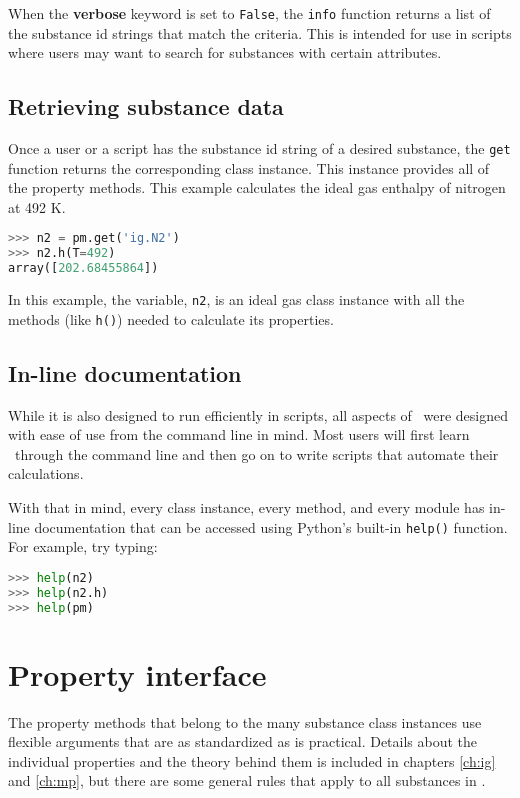 When the {\bf verbose} keyword is set to \texttt{False}, the \texttt{info} function returns a list of the substance id strings that match the criteria.  This is intended for use in scripts where users may want to search for substances with certain attributes.

\subsection{Retrieving substance data}

Once a user or a script has the substance id string of a desired substance, the \texttt{get} function returns the corresponding class instance.  This instance provides all of the property methods.  This example calculates the ideal gas enthalpy of nitrogen at 492 K.
\begin{lstlisting}[language=Python]
>>> n2 = pm.get('ig.N2')
>>> n2.h(T=492)
array([202.68455864])
\end{lstlisting}

In this example, the variable, \texttt{n2}, is an ideal gas class instance with all the methods (like \texttt{h()}) needed to calculate its properties.

\subsection{In-line documentation}

While it is also designed to run efficiently in scripts, all aspects of \PM\ were designed with ease of use from the command line in mind.  Most users will first learn \PM\ through the command line and then go on to write scripts that automate their calculations.  

With that in mind, every class instance, every method, and every module has in-line documentation that can be accessed using Python's built-in \texttt{help()} function.  For example, try typing:
\begin{lstlisting}[language=Python]
>>> help(n2)
>>> help(n2.h)
>>> help(pm)
\end{lstlisting}

\section{Property interface}

The property methods that belong to the many substance class instances use flexible arguments that are as standardized as is practical.  Details about the individual properties and the theory behind them is included in chapters \ref{ch:ig} and \ref{ch:mp}, but there are some general rules that apply to all substances in \PM.

